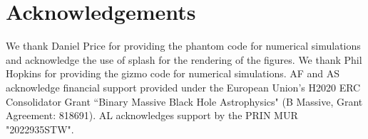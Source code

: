 \documentclass{aa}
\begin{document}
\section*{Acknowledgements}

We thank Daniel Price for providing the {\sc phantom} code for numerical simulations and acknowledge the use of {\sc splash} \citep{Price2007} for the rendering of the figures.
We thank Phil Hopkins for providing the {\sc gizmo} code for numerical simulations. 
AF and AS acknowledge financial support provided under the European Union’s H2020 ERC Consolidator Grant ``Binary Massive Black Hole Astrophysics" (B Massive, Grant Agreement: 818691). AL acknowledges support by the PRIN MUR "2022935STW".



%
%

\end{document}
